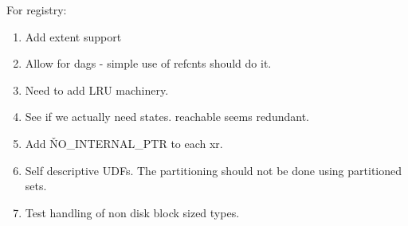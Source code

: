 For registry:
\begin{enumerate}
      	\item Add extent support
        \item Allow for dags - simple use of refcnts should do it.
        \item Need to add LRU machinery.
        \item See if we actually need states.  reachable seems redundant.
        \item Add \v{NO\_INTERNAL\_PTR} to each xr.

	\item Self descriptive UDFs.  The partitioning should
	not be done using partitioned sets.
	\item Test handling of non disk block sized types.

\end{enumerate}

% 
% 

